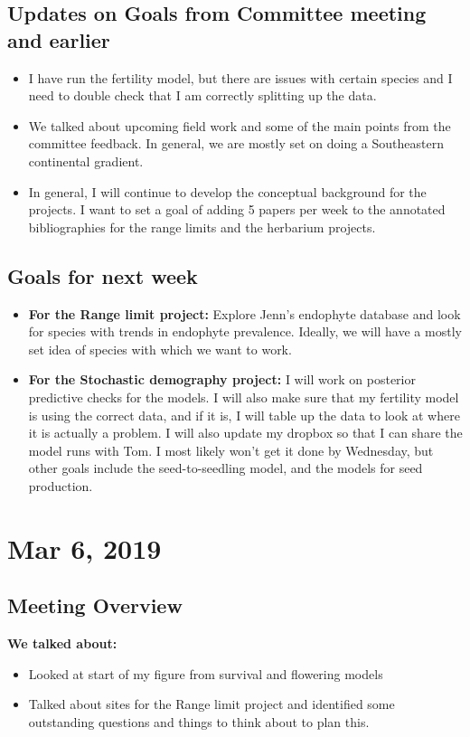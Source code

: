\documentclass{article}
\begin{document}
\subsection*{Updates on Goals from Committee meeting and earlier}
\begin{itemize}
\item{I have run the fertility model, but there are issues with certain species and I need to double check that I am correctly splitting up the data.}
\item{We talked about upcoming field work and some of the main points from the committee feedback. In general, we are mostly set on doing a Southeastern continental gradient.}
\item{In general, I will continue to develop the conceptual background for the projects. I want to set a goal of adding 5 papers per week to the annotated bibliographies for the range limits and the herbarium projects.}
\end{itemize}

\subsection*{Goals for next week}
\begin{itemize}
\item{\textbf{For the Range limit project:} Explore Jenn's endophyte database and look for species with trends in endophyte prevalence. Ideally, we will have a mostly set idea of species with which we want to work.}
\item{\textbf{For the Stochastic demography project:} I will work on posterior predictive checks for the models. I will also make sure that my fertility model is using the correct data, and if it is, I will table up the data to look at where it is actually a problem. I will also update my dropbox so that I can share the model runs with Tom. I most likely won't get it done by Wednesday, but other goals include the seed-to-seedling model, and the models for seed production.}
\end{itemize}

\section*{Mar 6, 2019}
\subsection*{Meeting Overview}
\textbf{We talked about:}
\begin{itemize}
\item{Looked at start of my figure from survival and flowering models}
\item{Talked about sites for the Range limit project and identified some outstanding questions and things to think about to plan this.}
\end{itemize}
\end{document}
